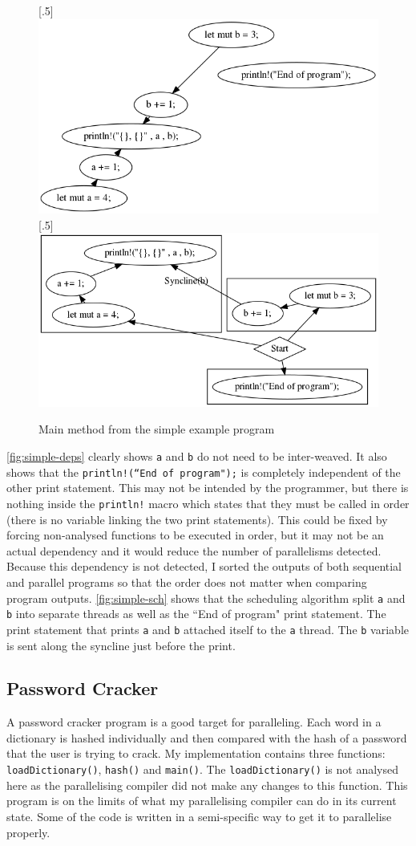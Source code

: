 \begin{figure}
    [.5\textwidth]{\includegraphics[width=.5\textwidth]{img/simple-example/main-dependency-analysis.png}}
    [.5\textwidth]{\includegraphics[width=.5\textwidth]{img/simple-example/main-schedule.png}}
    \caption{Main method from the simple example program}
\end{figure}

\autoref{fig:simple-deps} clearly shows \texttt{a} and \texttt{b} do not need to be inter-weaved. It also shows that the \texttt{println!(``End of program");} is completely independent of the other print statement. This may not be intended by the programmer, but there is nothing inside the \texttt{println!} macro which states that they must be called in order (there is no variable linking the two print statements). This could be fixed by forcing non-analysed functions to be executed in order, but it may not be an actual dependency and it would reduce the number of parallelisms detected. Because this dependency is not detected, I sorted the outputs of both sequential and parallel programs so that the order does not matter when comparing program outputs. \autoref{fig:simple-sch} shows that the scheduling algorithm split \texttt{a} and \texttt{b} into separate threads as well as the ``End of program" print statement. The print statement that prints \texttt{a} and \texttt{b} attached itself to the \texttt{a} thread. The \texttt{b} variable is sent along the syncline just before the print.

\subsection{Password Cracker}
A password cracker program is a good target for paralleling. Each word in a dictionary is hashed individually and then compared with the hash of a password that the user is trying to crack. My implementation contains three functions: \texttt{loadDictionary()}, \texttt{hash()} and \texttt{main()}. The \texttt{loadDictionary()} is not analysed here as the parallelising compiler did not make any changes to this function. This program is on the limits of what my parallelising compiler can do in its current state. Some of the code is written in a semi-specific way to get it to parallelise properly.

